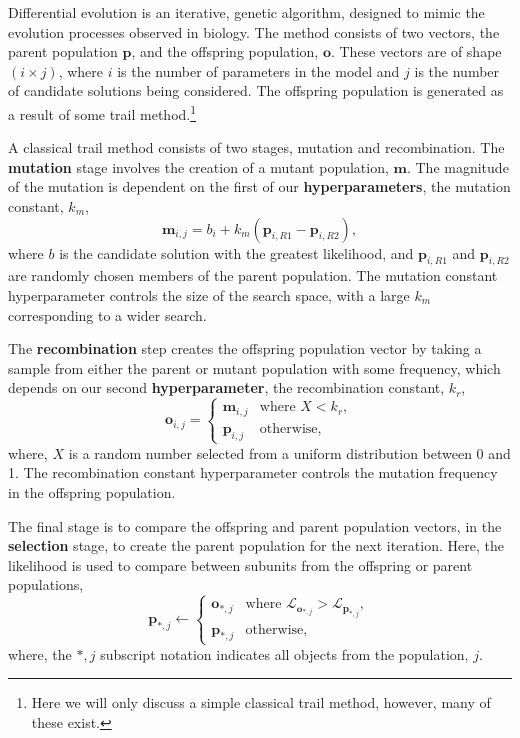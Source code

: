 \documentclass[twoside,symmetric]{tufte-handout}
\begin{document}
Differential evolution is an iterative, genetic algorithm, designed to mimic the evolution processes observed in biology.\cite{holland_adaptation_1992}
The method consists of two vectors, the parent population $\mathbf{p}$, and the offspring population, $\mathbf{o}$. 
These vectors are of shape $(i \times j)$, where $i$ is the number of parameters in the model and $j$ is the number of candidate solutions being considered. 
The offspring population is generated as a result of some trail method.\footnote{Here we will only discuss a simple classical trail method, however, many of these exist.}

A classical trail method consists of two stages, mutation and recombination. 
The \textbf{mutation} stage involves the creation of a mutant population, $\mathbf{m}$. 
The magnitude of the mutation is dependent on the first of our \textbf{hyperparameters}, the mutation constant, $k_m$, 
%
\begin{equation}
    \mathbf{m}_{i,j} = b_i + k_m (\mathbf{p}_{i, R1} - \mathbf{p}_{i, R2}),
\end{equation}
%
where $b$ is the candidate solution with the greatest likelihood, and $\mathbf{p}_{i, R1}$ and $\mathbf{p}_{i, R2}$ are randomly chosen members of the parent population. 
The mutation constant hyperparameter controls the size of the search space, with a large $k_m$ corresponding to a wider search. 

The \textbf{recombination} step creates the offspring population vector by taking a sample from either the parent or mutant population with some frequency, which depends on our second \textbf{hyperparameter}, the recombination constant, $k_r$,
%
\begin{equation}
    \mathbf{o}_{i, j} = 
    \begin{cases}
        \mathbf{m}_{i, j} & \text{where } X < k_r,\\
        \mathbf{p}_{i, j} & \text{otherwise},
    \end{cases}
\end{equation}
%
where, $X$ is a random number selected from a uniform distribution between 0 and 1. 
The recombination constant hyperparameter controls the mutation frequency in the offspring population. 

The final stage is to compare the offspring and parent population vectors, in the \textbf{selection} stage, to create the parent population for the next iteration. 
Here, the likelihood is used to compare between subunits from the offspring or parent populations, 
%
\begin{equation}
    \mathbf{p}_{*, j} \leftarrow 
    \begin{cases}
        \mathbf{o}_{*, j} & \text{where } \mathcal{L}_{\mathbf{o}_{*, j}} > \mathcal{L}_{\mathbf{p}_{*, j}},\\
        \mathbf{p}_{*, j} & \text{otherwise},
    \end{cases}
\end{equation}
%
where, the $*, j$ subscript notation indicates all objects from the population, $j$.
\end{document}
